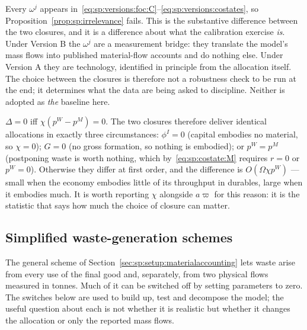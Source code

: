  Every $\omega^j$ appears
in~\eqref{eq:sp:versions:foc:C}--\eqref{eq:sp:versions:costates}, so
Proposition~\ref{prop:sp:irrelevance} fails. This is the substantive difference between the two
closures, and it is a difference about what the calibration exercise \emph{is}. Under Version B the
$\omega^j$ are a measurement bridge: they translate the model's mass flows into published
material-flow accounts and do nothing else. Under Version A they are technology, identified in
principle from the allocation itself. The choice between the closures is therefore not a robustness
check to be run at the end; it determines what the data are being asked to discipline. Neither is
adopted as \emph{the} baseline here.

\begin{remark}\label{rem:sp:coincide}
$\Delta=0$ iff $\chi\left(p^W-p^M\right)=0$. The two closures therefore deliver identical
allocations in exactly three circumstances: $\phi^I=0$ (capital embodies no material, so $\chi=0$);
$G=0$ (no gross formation, so nothing is embodied); or $p^W=p^M$ (postponing waste is worth nothing,
which by~\eqref{eq:sp:costate:M} requires $r=0$ or $p^W=0$). Otherwise they differ at first order,
and the difference is $O\!\left(\Omega\chi p^W\right)$ --- small when the economy embodies little of
its throughput in durables, large when it embodies much. It is worth reporting $\chi$ alongside
$a\varpi$ for this reason: it is the statistic that says how much the choice of closure can matter.
\end{remark}


\subsection{Simplified waste-generation schemes}\label{sec:sp:versions:simple}

The general scheme of Section~\ref{sec:sp:setup:materialaccounting} lets waste arise from every use
of the final good and, separately, from two physical flows measured in tonnes. Much of it can be
switched off by setting parameters to zero. The switches below are used to build up, test and
decompose the model; the useful question about each is not whether it is realistic but whether it
changes the allocation or only the reported mass flows.

